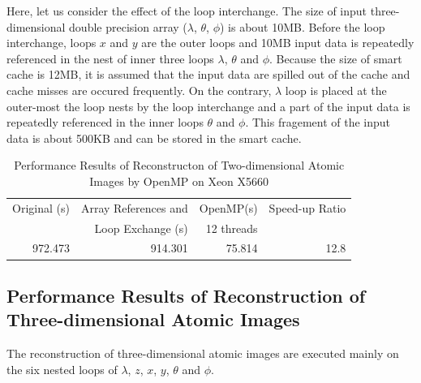 \documentclass[graybox,vecphys]{svmult}
\begin{document}
Here, let us consider the effect of the loop interchange.
The size of input three-dimensional double precision array ($\lambda$,
$\theta$, $\phi$) is about 10MB. Before the loop interchange, loops $x$
and $y$ are the outer loops and 10MB input data is repeatedly referenced
in the nest of inner three loops $\lambda$, $\theta$ and $\phi$. Because
the size of smart cache is 12MB, it is assumed that the input data are
spilled out of the cache and cache misses are occured frequently.
On the contrary, $\lambda$ loop is placed at the outer-most the loop nests
by the loop interchange and a part of the input data is repeatedly
referenced in the inner loops $\theta$ and $\phi$. This fragement of
the input data is about 500KB and can be stored in the smart cache.



\begin{table}[t]
  \begin{center}
  \caption{Performance Results of Reconstructon of Two-dimensional Atomic Images by OpenMP on Xeon X5660}\label{tab:reconst2d}
  \begin{tabular}{r|r|r|r}\hline\hline
    Original (s) & Array References and    & OpenMP(s) & Speed-up Ratio \\
                & Loop Exchange (s)        & 12 threads &          \\\hline\hline
    972.473     & 914.301                  &     75.814 & 12.8 \\
    \hline
  \end{tabular}
  \end{center}
\end{table}

\subsection{Performance Results of Reconstruction of Three-dimensional Atomic Images}
The reconstruction of three-dimensional atomic images are executed
mainly on the six nested loops of $\lambda$, $z$, $x$, $y$, $\theta$
and $\phi$.
\end{document}
